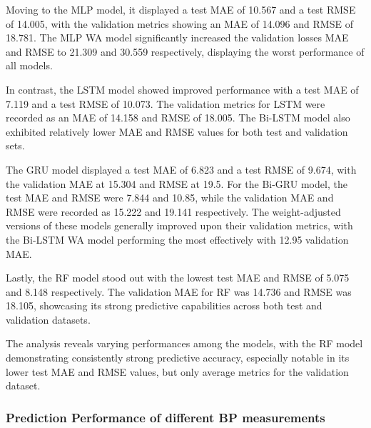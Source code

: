 Moving to the MLP model, it displayed a test MAE of 10.567 and a test RMSE of 14.005, with the validation metrics showing an MAE of 14.096 and RMSE of 18.781.
The MLP WA model significantly increased the validation losses MAE and RMSE to 21.309 and 30.559 respectively, displaying the worst performance of all models.

In contrast, the LSTM model showed improved performance with a test MAE of 7.119 and a test RMSE of 10.073.
The validation metrics for LSTM were recorded as an MAE of 14.158 and RMSE of 18.005.
The Bi-LSTM model also exhibited relatively lower MAE and RMSE values for both test and validation sets.

The GRU model displayed a test MAE of 6.823 and a test RMSE of 9.674, with the validation MAE at 15.304 and RMSE at 19.5.
For the Bi-GRU model, the test MAE and RMSE were 7.844 and 10.85, while the validation MAE and RMSE were recorded as 15.222 and 19.141 respectively.
The weight-adjusted versions of these models generally improved upon their validation metrics, with the Bi-LSTM WA model performing the most effectively with 12.95 validation MAE\@.

Lastly, the RF model stood out with the lowest test MAE and RMSE of 5.075 and 8.148 respectively.
The validation MAE for RF was 14.736 and RMSE was 18.105, showcasing its strong predictive capabilities across both test and validation datasets.

The analysis reveals varying performances among the models, with the RF model demonstrating consistently strong predictive accuracy,
especially notable in its lower test MAE and RMSE values, but only average metrics for the validation dataset.

\subsubsection{Prediction Performance of different BP measurements}
\label{subsubsec:bp_prediction_performance}

